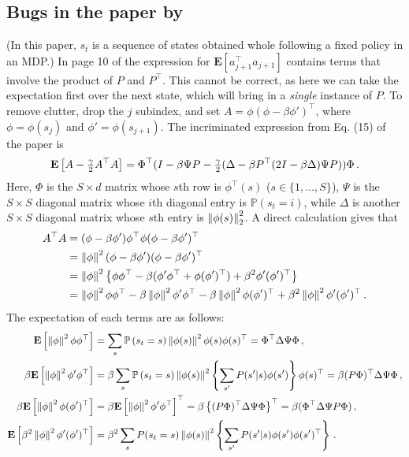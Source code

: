 \documentclass{article}
\newcommand{\Prob}[1]{\mathbb{P}\left(#1\right)}
\begin{document}
\subsection{Bugs in the paper by  \cite{lstdicmla}}
(In this paper, $s_t$ is a sequence of states obtained whole following a fixed policy in an MDP.)
In page 10 of \cite{lstdicmla} the expression for $\mathbf{E}[a_{j+1}^\top a_{j+1}]$ contains terms that involve the product of $P$ and $P^\top$. This cannot be correct, as here we can take the expectation first over the next state, which will bring in a \emph{single} instance of $P$.
To remove clutter, drop the $j$ subindex, and set $A = \phi(\phi- \beta \phi')^\top$, where $\phi  = \phi(s_{j})$ and $\phi' = \phi(s_{j+1})$.
The incriminated expression from Eq. (15) of the paper is
\begin{align}
\mathbf{E}\left[ A - \tfrac{\gamma}{2} A^\top A  \right] = \Phi^\top (I - \beta \Psi P - \tfrac{\gamma}{2}(\Delta - \beta P^\top (2I - \beta \Delta)\Psi P) ) \Phi\,.
\label{eq:bad1}
\end{align}
Here, $\Phi$ is the $S\times d$ matrix whose $s$th row is $\phi^\top(s)$ ($s\in \{1, \dots, S\}$),
$\Psi$ is the $S \times S$ diagonal matrix whose $i$th diagonal entry is $\Prob{s_t = i}$,  
while $\Delta$ is another $S\times S$ diagonal matrix whose $s$th entry is $\left\| \phi(s)\right\|_2^2$.
A direct calculation gives that
\begin{align}
A^\top A 
& = ( \phi-\beta \phi') \phi^\top \phi ( \phi-\beta \phi')^\top  \nonumber \\
& = \left\| \phi\right\|^2  ( \phi-\beta \phi') ( \phi-\beta \phi')^\top \nonumber \\
& = \left\| \phi\right\|^2  \left\{ \phi \phi^\top-\beta (\phi' \phi^\top + \phi (\phi')^\top) + \beta^2 \phi' (\phi')^\top \right\}\, \nonumber \\
& = \left\| \phi\right\|^2  \phi \phi^\top-\beta \left\| \phi\right\|^2 \phi' \phi^\top -\beta \left\| \phi\right\|^2  \phi (\phi')^\top + \beta^2 
\left\| \phi\right\|^2 \phi' (\phi')^\top\,.
\end{align}
The expectation of each terms are as follows:
\begin{align*}
\EE{\norm{\phi}^2  \phi \phi^\top } 
& = \sum_s \Prob{s_t = s}\norm{\phi(s)}^2 \phi(s) \phi(s)^\top = \Phi^\top \Delta \Psi \Phi\,,\\
\beta \EE{\norm{\phi}^2 \phi' \phi^\top } 
& = \beta \sum_s \Prob{s_t = s}\norm{\phi(s)}^2 \left\{ \sum_{s'}  P(s'|s) \phi(s')  \right\} \phi(s)^\top 
   = \beta (P \Phi)^\top \Delta \Psi \Phi\,,\\
\beta \EE{\norm{\phi}^2 \phi (\phi')^\top } 
& = \beta \EE{\norm{\phi}^2 \phi' \phi^\top }^\top
= \beta \left\{(P \Phi)^\top \Delta \Psi \Phi\right\}^\top 
=  \beta (\Phi^\top \Delta \Psi P \Phi) \,,\\
\EE{ \beta^2  \norm{\phi}^2 \phi' (\phi')^\top } 
& =\beta^2 \sum_s P(s_t=s) \norm{\phi(s)}^2 \left\{ \sum_{s'} P(s'|s) \phi(s') \phi(s')^\top \right\}\,.
\end{align*}
\end{document}
